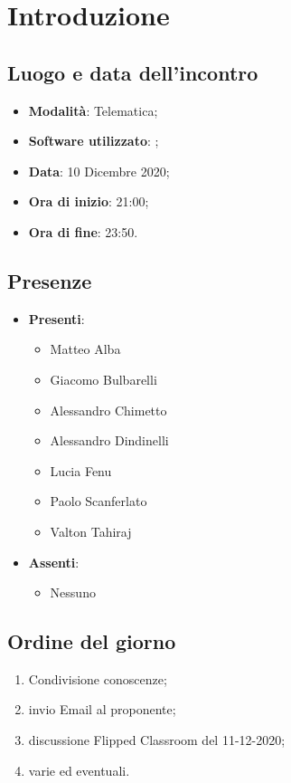 \documentclass[]{article}
\begin{document}
	

	\newpage
\section{Introduzione}
\subsection{Luogo e data dell'incontro}
\begin{itemize}
	\item \textbf{Modalità}: Telematica;
	\item \textbf{Software utilizzato}: ;
	\item \textbf{Data}: 10 Dicembre 2020;
	\item \textbf{Ora di inizio}: 21:00;
	\item \textbf{Ora di fine}: 23:50.
\end{itemize}

\subsection{Presenze}
\begin{itemize}
	\item \textbf{Presenti}:
	\begin{itemize}
		\item Matteo Alba
		\item Giacomo Bulbarelli
		\item Alessandro Chimetto
		\item Alessandro Dindinelli
		\item Lucia Fenu
		\item Paolo Scanferlato
		\item Valton Tahiraj
	\end{itemize}
	\item \textbf{Assenti}:
	\begin{itemize}
		\item Nessuno
	\end{itemize}
\end{itemize}


\subsection{Ordine del giorno}
\begin{enumerate}
	\item Condivisione conoscenze;
	\item invio Email al proponente;
	\item discussione Flipped Classroom del 11-12-2020;
	\item varie ed eventuali.
\end{enumerate}
\end{document}
